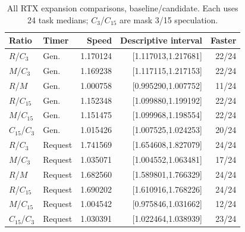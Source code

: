 \begingroup\small
\begin{table}[t]\centering
\caption{All RTX expansion comparisons, baseline/candidate. Each uses 24 task medians; $C_3$/$C_{15}$ are mask 3/15 speculation.}\label{tab:rtx_all}
\begin{tabular}{@{}llrrr@{}}
\toprule
Ratio & Timer & Speed & Descriptive interval & Faster\\\midrule
$R$/$C_3$ & Gen. & 1.170124 & [1.117013,1.217681] & 22/24\\
$M$/$C_3$ & Gen. & 1.169238 & [1.117115,1.217153] & 22/24\\
$R$/$M$ & Gen. & 1.000758 & [0.995290,1.007752] & 11/24\\
$R$/$C_{15}$ & Gen. & 1.152348 & [1.099880,1.199192] & 22/24\\
$M$/$C_{15}$ & Gen. & 1.151475 & [1.099968,1.198554] & 22/24\\
$C_{15}$/$C_3$ & Gen. & 1.015426 & [1.007525,1.024253] & 20/24\\
$R$/$C_3$ & Request & 1.741569 & [1.654608,1.827079] & 24/24\\
$M$/$C_3$ & Request & 1.035071 & [1.004552,1.063481] & 17/24\\
$R$/$M$ & Request & 1.682560 & [1.589801,1.766329] & 24/24\\
$R$/$C_{15}$ & Request & 1.690202 & [1.610916,1.768226] & 24/24\\
$M$/$C_{15}$ & Request & 1.004542 & [0.975846,1.031662] & 12/24\\
$C_{15}$/$C_3$ & Request & 1.030391 & [1.022464,1.038939] & 23/24\\
\bottomrule\end{tabular}
\end{table}

\endgroup

